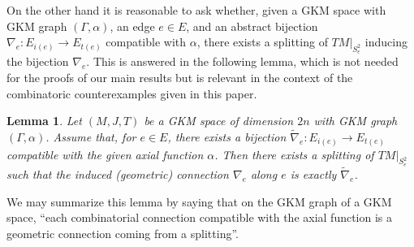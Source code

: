 \documentclass[12pt,a4paper]{amsart}
\newtheorem{lem}[thm]{Lemma}
\theoremstyle{plain}
\theoremstyle{definition}
\begin{document}
On the other hand it is reasonable to ask whether, given a GKM space with GKM graph $(\Gamma,\alpha)$, an edge $e\in E$, and an abstract 
bijection $\nabla_e\colon E_{i(e)}\to E_{t(e)}$ compatible with $\alpha$, 
there exists a splitting of $TM|_{S^2_e}$ inducing the bijection $\nabla_e$. This is
answered in the following lemma, which is not needed for the proofs of
our main results but is relevant in the context of the combinatoric counterexamples given
in this paper.


\begin{lem}\label{geom and comb connection}
Let $(M,J,T)$ be a GKM space of dimension $2n$ with GKM graph $(\Gamma,\alpha)$. Assume that, for $e\in E$, there exists a bijection $\widetilde{\nabla}_e\colon E_{i(e)}\to E_{t(e)}$ compatible with
the given axial function $\alpha$. 
Then there exists a splitting of $TM|_{S^2_e}$ such that
the induced (geometric) connection $\nabla_e$ along $e$ is exactly $\widetilde{\nabla}_e$.
\end{lem}
We may summarize this lemma by saying that on the GKM graph of a GKM space, ``each combinatorial connection compatible
with the axial function is a geometric connection coming from a splitting''. 
\end{document}
